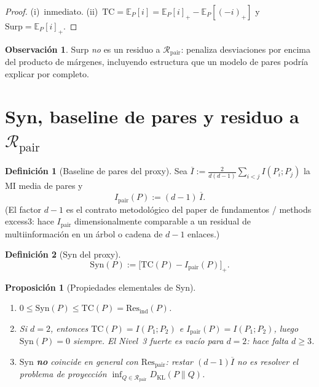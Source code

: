 \documentclass[11pt,a4paper]{article}
\theoremstyle{definition}
\newtheorem{definition}{Definici\'on}[section]
\newtheorem{remark}{Observaci\'on}[section]
\theoremstyle{plain}
\newtheorem{proposition}{Proposici\'on}[section]
\theoremstyle{remark}
\newcommand{\Res}{\mathrm{Res}}
\newcommand{\TC}{\mathrm{TC}}
\newcommand{\Syn}{\mathrm{Syn}}
\newcommand{\Surp}{\mathrm{Surp}}
\newcommand{\Rpair}{\mathcal{R}_{\mathrm{pair}}}
\newcommand{\KL}{D_{\mathrm{KL}}}
\begin{document}
\begin{proof}
(i)~inmediato. (ii)~$\TC=\mathbb{E}_P[i]=\mathbb{E}_P[i]_+-\mathbb{E}_P[(-i)_+]$
y $\Surp=\mathbb{E}_P[i]_+$.
\end{proof}

\begin{remark}
Surp \emph{no} es un residuo a $\Rpair$: penaliza desviaciones por encima
del producto de m\'argenes, incluyendo estructura que un modelo de pares
podr\'ia explicar por completo.
\end{remark}

\section{Syn, baseline de pares y residuo a $\Rpair$}
\label{sec:Syn}

\begin{definition}[Baseline de pares del proxy]
\label{def:Ipair}
Sea $\overline{I}:=\frac{2}{d(d-1)}\sum_{i<j}I(P_i;P_j)$ la MI media de
pares y
\begin{equation}
\label{eq:Ipair}
I_{\mathrm{pair}}(P):=(d-1)\,\overline{I}.
\end{equation}
(El factor $d-1$ es el contrato metodol\'ogico del paper de fundamentos /
methods excess3: hace $I_{\mathrm{pair}}$ dimensionalmente comparable a un
residual de multiinformaci\'on en un \'arbol o cadena de $d-1$ enlaces.)
\end{definition}

\begin{definition}[Syn del proxy]
\label{def:Syn}
\begin{equation}
\label{eq:Syn}
\Syn(P):=\bigl[\TC(P)-I_{\mathrm{pair}}(P)\bigr]_+.
\end{equation}
\end{definition}

\begin{proposition}[Propiedades elementales de Syn]
\label{prop:Syn_props}
\begin{enumerate}[label=(\roman*)]
  \item $0\le\Syn(P)\le\TC(P)=\Res_{\mathrm{ind}}(P)$.
  \item Si $d=2$, entonces $\TC(P)=I(P_1;P_2)$ e
  $I_{\mathrm{pair}}(P)=I(P_1;P_2)$, luego $\Syn(P)=0$ siempre.
  El Nivel~3 fuerte es vac\'io para $d=2$: hace falta $d\ge 3$.
  \item $\Syn$ \textbf{no} coincide en general con
  $\Res_{\mathrm{pair}}$: restar $(d-1)\overline{I}$ no es resolver el
  problema de proyecci\'on $\inf_{Q\in\Rpair}\KL(P\|Q)$.
\end{enumerate}
\end{proposition}
\end{document}
